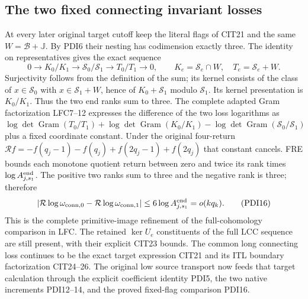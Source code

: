 \documentclass[10pt]{article}
\begin{document}
\subsection{The two fixed connecting invariant losses}

At every later original target cutoff keep the literal flags
of CIT21 and the same $W=\mathscr B+\mathbb J$.
By PDI6 their nesting has codimension exactly three.
The identity on representatives gives the exact sequence
\[
 0\longrightarrow K_0/K_1\longrightarrow
 \mathscr S_0/\mathscr S_1\longrightarrow
 T_0/T_1\longrightarrow0,\qquad
 K_e=\mathscr S_e\cap W,\quad T_e=\mathscr S_e+W .
 \tag{PDI15}
\]
Surjectivity follows from the definition of the sum; its
kernel consists of the class of $x\in\mathscr S_0$ with
$x\in\mathscr S_1+W$, hence of $K_0+\mathscr S_1$ modulo
$\mathscr S_1$. Its kernel presentation is $K_0/K_1$.
Thus the two end ranks sum to three.
The complete adapted Gram factorization LFC7--12 expresses
the difference of the two loss logarithms as
$\log\det\operatorname{Gram}(T_0/T_1)
+\log\det\operatorname{Gram}(K_0/K_1)
-\log\det\operatorname{Gram}(\mathscr S_0/\mathscr S_1)$
plus a fixed coordinate constant. Under the original four-return
$\mathcal Rf=-f(q_j-1)-f(q_j)+f(2q_j-1)+f(2q_j)$ that
constant cancels. FRE bounds each monotone quotient return
between zero and twice its rank times
$\log A_{j,s_1}^{\rm end}$. The positive two ranks sum to
three and the negative rank is three; therefore
\[
 \left|\mathcal R\log\omega_{{\rm conn},0}
        -\mathcal R\log\omega_{{\rm conn},1}\right|
 \le6\log A_{j,s_1}^{\rm end}=o(kq_k).
 \tag{PDI16}
\]
This is the complete primitive-image refinement of the
full-cohomology comparison in LFC. The retained
$\ker U_e$ constituents of the full LCC sequence are still
present, with their explicit CIT23 bounds. The common long
connecting loss continues to be the exact target expression
CIT21 and its ITL boundary factorization CIT24--26. The
original low source transport now feeds that target calculation
through the explicit coefficient identity PDI5, the two
native increments PDI12--14, and the proved fixed-flag
comparison PDI16.
\end{document}
